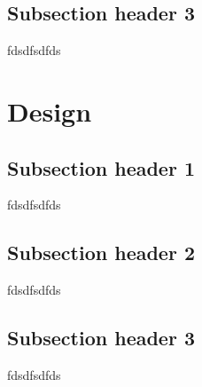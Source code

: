 \subsection{Subsection header 3}
fdsdfsdfds

\section{Design}

\subsection{Subsection header 1}
fdsdfsdfds
\subsection{Subsection header 2}
fdsdfsdfds
\subsection{Subsection header 3}
fdsdfsdfds
